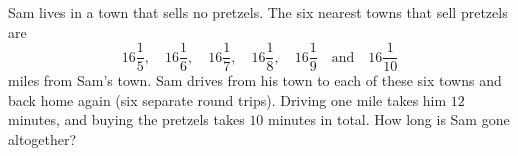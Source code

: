 Sam lives in a town that sells no pretzels. The six nearest towns that sell pretzels are
\[16\dfrac15,\quad 16\dfrac16,\quad 16\dfrac17,\quad 16\dfrac18,\quad 16\dfrac19\quad\text{and}\quad 16\dfrac1{10}\]
miles from Sam's town. Sam drives from his town to each of these six towns and back home again (six separate round trips). Driving one mile takes him $12$ minutes, and buying the pretzels takes $10$ minutes in total. How long is Sam gone altogether?
